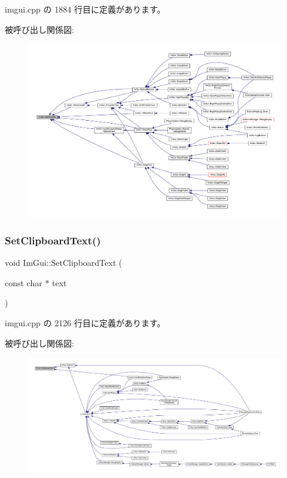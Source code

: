  imgui.\+cpp の 1884 行目に定義があります。

被呼び出し関係図\+:\nopagebreak
\begin{figure}[H]
\begin{center}
\leavevmode
\includegraphics[width=350pt]{namespace_im_gui_a27b8ace13a8c421ee8405f0cbebe4ead_icgraph}
\end{center}
\end{figure}
\mbox{\label{namespace_im_gui_aa4824a1b351c063b4aff9b9f4fb5fd4d}} 
\subsubsection{\texorpdfstring{Set\+Clipboard\+Text()}{SetClipboardText()}}
{\footnotesize\ttfamily void Im\+Gui\+::\+Set\+Clipboard\+Text (\begin{DoxyParamCaption}\item[{const char $\ast$}]{text }\end{DoxyParamCaption})}



 imgui.\+cpp の 2126 行目に定義があります。

被呼び出し関係図\+:
\nopagebreak
\begin{figure}[H]
\begin{center}
\leavevmode
\includegraphics[width=350pt]{namespace_im_gui_aa4824a1b351c063b4aff9b9f4fb5fd4d_icgraph}
\end{center}
\end{figure}
\mbox{\label{namespace_im_gui_ac768151f2ac6c7d79b31b934cc0e9d05}} 
